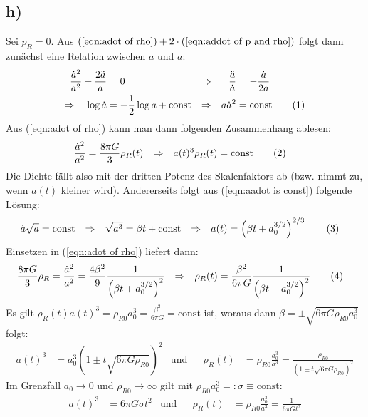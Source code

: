 \documentclass[a4paper,12pt]{article}
\newcommand\numberthis{\addtocounter{equation}{1}\tag{\theequation}}
\newcommand{\kla}{}
\newcommand{\tecxt}{}
\begin{document}
\subsection*{h)}Sei $p_R=0$. Aus $(\ref{eqn:adot of rho})+2\cdot(\ref{eqn:addot of p and rho})$ folgt dann zunächst eine Relation zwischen $\dot{a}$ und $a$:
\begin{align*}
\frac{\dot{a}^2}{a^2}+\frac{2\ddot{a}}{a}&=0&\Rightarrow &&\frac{\ddot{a}}{\dot{a}}&=-\frac{\dot{a}}{2a}\\
\Rightarrow\ \ \ \log\dot{a}&=-\frac{1}{2}\log a+\tecxt\text{const}&\Rightarrow &&a\dot{a}^2&=\tecxt\text{const}\numberthis\label{eqn:aadot is const}
\end{align*}
Aus (\ref{eqn:adot of rho}) kann man dann folgenden Zusammenhang ablesen:
\begin{align*}
\frac{\dot{a}^2}{a^2}&=\frac{8\pi G}{3}\rho_R(t)&\Rightarrow &&a(t)^3\rho_R(t)&=\tecxt\text{const}\numberthis\label{eqn:rho a3 is const}
\end{align*}
Die Dichte fällt also mit der dritten Potenz des Skalenfaktors ab (bzw. nimmt zu, wenn $a(t)$ kleiner wird). Andererseits folgt aus (\ref{eqn:aadot is const}) folgende Lösung:
\begin{align*}
\dot{a}\sqrt{a}&=\tecxt\text{const}&\Rightarrow &&\sqrt{a^3}&=\beta t+\tecxt\text{const}&\Rightarrow &&a(t)&=\kla\left( {\beta t+a_0^{3/2}} \right)^{2/3}\numberthis\label{eqn:a of t and beta}
\end{align*}
Einsetzen in (\ref{eqn:adot of rho}) liefert dann:
\begin{align*}
\frac{8\pi G}{3}\rho_R&=\frac{\dot{a}^2}{a^2}=\frac{4\beta^2}{9}\frac{1}{\kla\left( {\beta t+a_0^{3/2}} \right)^2}&\Rightarrow &&\rho_R(t)&=\frac{\beta^2}{6\pi G}\frac{1}{\kla\left( {\beta t+a_0^{3/2}} \right)^2}\numberthis\label{eqn:rho of t and beta}
\end{align*}
Es gilt $\rho_R(t)a(t)^3=\rho_{R0}a_0^3=\frac{\beta^2}{6\pi G}=\tecxt\text{const}$ ist, woraus dann $\beta=\pm\sqrt{6\pi G\rho_{R0}a_0^3}$ folgt:
\begin{align*}
a(t)^3&=a_0^3\kla\left( {1\pm t\sqrt{6\pi G\rho_{R0}}} \right)^2&\tecxt\text{und}&&\rho_R(t)&=\rho_{R0}\frac{a_0^3}{a^3}=\frac{\rho_{R0}}{\kla\left( {1\pm t\sqrt{6\pi G\rho_{R0}}} \right)^2}
\end{align*}
Im Grenzfall $a_0\rightarrow 0$ und $\rho_{R0}\rightarrow\infty$ gilt mit $\rho_{R0}a_0^3=:\sigma\equiv\tecxt\text{const}$:
\begin{align*}
a(t)^3&=6\pi G\sigma t^2&\tecxt\text{und}&&\rho_R(t)&=\rho_{R0}\frac{a_0^3}{a^3}=\frac{1}{6\pi Gt^2}
\end{align*}
\end{document}
